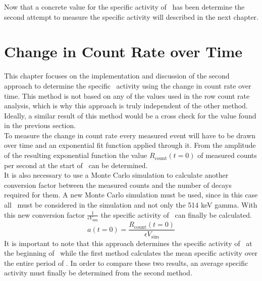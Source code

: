 \documentclass[encoding=utf8,british]{tumphthesis}
\begin{document}
Now that a concrete value for the specific activity of \Kr\ has been determine the second attempt to measure the specific activity will described in the next chapter.
\\  
\fi







\chapter{Change in Count Rate over Time}
\label{sec:SAfromDecrease}

This chapter focuses on the implementation and discussion of the second approach to determine the specific \Kr\ activity using the change in count rate over time.
This method is not based on any of the values used in the row count rate analysis, which is why this approach is truly independent of the other method.
Ideally, a similar result of this method would be a cross check for the value found in the previous section. 
\\

To measure the change in count rate every measured event will have to be drawn over time and an exponential fit function applied through it.
From the amplitude of the resulting exponential function the value $R_{\mathrm{count}}(t=0)$ of measured counts per second at the start of \PII\ can be determined.
\\

It is also necessary to use a Monte Carlo simulation to calculate another conversion factor between the measured counts and the number of decays required for them. 
A new Monte Carlo simulation must be used, since in this case all \Kr\ must be considered in the simulation and not only the 514 keV gamma.
With this new conversion factor $\frac{1}{\epsilon V_{\mathrm{sim}}}$ the specific activity of \Kr\ can finally be calculated.
\begin{equation}
a(t=0) = \frac{R_{\mathrm{count}}(t=0)}{\epsilon V_{\mathrm{sim}}}
\label{equ:ActivityDieZweite}
\end{equation}
It is important to note that this approach determines the specific activity of \Kr\ at the beginning of \PII\, while the first method calculates the mean specific activity over the entire period of \PII.
In order to compare these two results, an average specific activity must finally be determined from the second method.
\\
\end{document}
